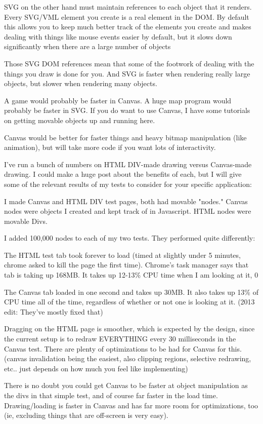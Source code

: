 SVG on the other hand must maintain references to each object that it renders. Every SVG/VML element you create is a real element in the DOM. By default this allows you to keep much better track of the elements you create and makes dealing with things like mouse events easier by default, but it slows down significantly when there are a large number of objects

Those SVG DOM references mean that some of the footwork of dealing with the things you draw is done for you. And SVG is faster when rendering really large objects, but slower when rendering many objects.

A game would probably be faster in Canvas. A huge map program would probably be faster in SVG. If you do want to use Canvas, I have some tutorials on getting movable objects up and running here.

Canvas would be better for faster things and heavy bitmap manipulation (like animation), but will take more code if you want lots of interactivity.

I've run a bunch of numbers on HTML DIV-made drawing versus Canvas-made drawing. I could make a huge post about the benefits of each, but I will give some of the relevant results of my tests to consider for your specific application:

I made Canvas and HTML DIV test pages, both had movable "nodes." Canvas nodes were objects I created and kept track of in Javascript. HTML nodes were movable Divs.

I added 100,000 nodes to each of my two tests. They performed quite differently:

The HTML test tab took forever to load (timed at slightly under 5 minutes, chrome asked to kill the page the first time). Chrome's task manager says that tab is taking up 168MB. It takes up 12-13\% CPU time when I am looking at it, 0%

The Canvas tab loaded in one second and takes up 30MB. It also takes up 13\% of CPU time all of the time, regardless of whether or not one is looking at it. (2013 edit: They've mostly fixed that)

Dragging on the HTML page is smoother, which is expected by the design, since the current setup is to redraw EVERYTHING every 30 milliseconds in the Canvas test. There are plenty of optimizations to be had for Canvas for this. (canvas invalidation being the easiest, also clipping regions, selective redrawing, etc.. just depends on how much you feel like implementing)

There is no doubt you could get Canvas to be faster at object manipulation as the divs in that simple test, and of course far faster in the load time. Drawing/loading is faster in Canvas and has far more room for optimizations, too (ie, excluding things that are off-screen is very easy).